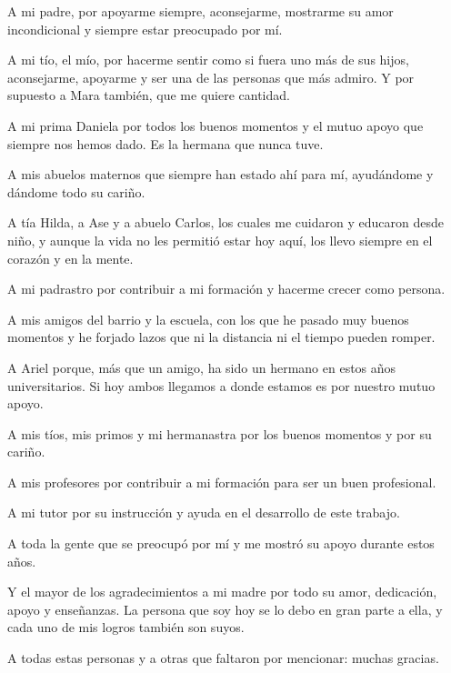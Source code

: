 \begin{acknowledgements}
    A mi padre, por apoyarme siempre, aconsejarme, mostrarme su amor incondicional y siempre estar preocupado por m\'i.
    
    A mi t\'io, el m\'io, por hacerme sentir como si fuera uno m\'as de sus hijos, aconsejarme, apoyarme y ser una de las personas que m\'as admiro. Y por supuesto a Mara tambi\'en, que me quiere cantidad.
    
    A mi prima Daniela por todos los buenos momentos y el mutuo apoyo que siempre nos hemos dado. Es la hermana que nunca tuve.
    
    A mis abuelos maternos que siempre han estado ah\'i para m\'i, ayud\'andome y d\'andome todo su cari\~no.
    
    A t\'ia Hilda, a Ase y a abuelo Carlos, los cuales me cuidaron y educaron desde ni\~no, y aunque la vida no les permiti\'o estar hoy aqu\'i, los llevo siempre en el coraz\'on y en la mente.
    
    A mi padrastro por contribuir a mi formaci\'on y hacerme crecer como persona.
    
    A mis amigos del barrio y la escuela, con los que he pasado muy buenos momentos y he forjado lazos que ni la distancia ni el tiempo pueden romper.
    
    A Ariel porque, m\'as que un amigo, ha sido un hermano en estos a\~nos universitarios. Si hoy ambos llegamos a donde estamos es por nuestro mutuo apoyo.
    
    A mis t\'ios, mis primos y mi hermanastra por los buenos momentos y por su cari\~no.
    
    A mis profesores por contribuir a mi formaci\'on para ser un buen profesional.
    
    A mi tutor por su instrucci\'on y ayuda en el desarrollo de este trabajo.
    
    A toda la gente que se preocup\'o por m\'i y me mostr\'o su apoyo durante estos a\~nos.
    
    Y el mayor de los agradecimientos a mi madre por todo su amor, dedicaci\'on, apoyo y ense\~nanzas. La persona que soy hoy se lo debo en gran parte a ella, y cada uno de mis logros tambi\'en son suyos.
    
    A todas estas personas y a otras que faltaron por mencionar: muchas gracias.   
\end{acknowledgements}